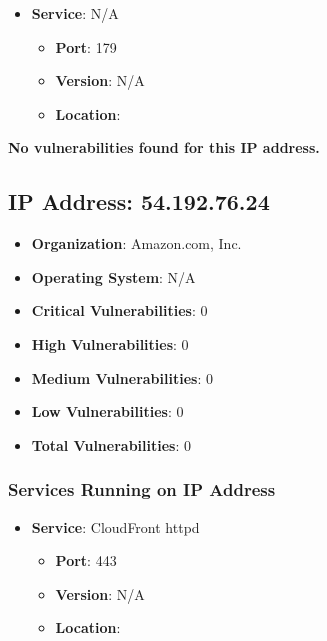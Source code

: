 \documentclass{article}
\begin{document}
\begin{itemize}
    
        \item \textbf{Service}: N/A
        \begin{itemize}
            \item \textbf{Port}: 179
            \item \textbf{Version}:  N/A 
            \item \textbf{Location}: \href{  }{  }
        \end{itemize}
    
\end{itemize}


\textbf{No vulnerabilities found for this IP address.}




\clearpage



\subsection{IP Address: 54.192.76.24}

\begin{itemize}
    \item \textbf{Organization}: Amazon.com, Inc.
    \item \textbf{Operating System}:  N/A 
    \item \textbf{Critical Vulnerabilities}: 0
    \item \textbf{High Vulnerabilities}: 0
    \item \textbf{Medium Vulnerabilities}: 0
    \item \textbf{Low Vulnerabilities}: 0
    \item \textbf{Total Vulnerabilities}: 0
\end{itemize}

\subsubsection*{Services Running on IP Address}

\begin{itemize}
    
        \item \textbf{Service}: CloudFront httpd
        \begin{itemize}
            \item \textbf{Port}: 443
            \item \textbf{Version}:  N/A 
            \item \textbf{Location}: \href{  }{  }
        \end{itemize}
    
\end{itemize}
\end{document}
